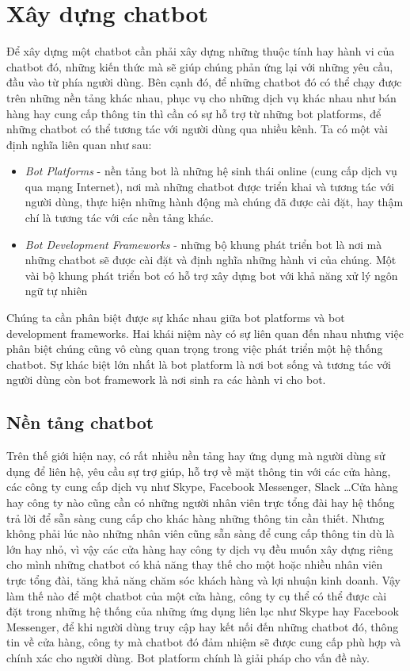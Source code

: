 \documentclass[12pt]{report}
\begin{document}
\section{Xây dựng chatbot}

Để xây dựng một chatbot cần phải xây dựng những thuộc tính hay hành vi của chatbot đó, những kiến thức mà sẽ giúp chúng phản ứng lại với những yêu cầu, đầu vào từ phía người dùng. Bên cạnh đó, để những chatbot đó có thể chạy được trên những nền tảng khác nhau, phục vụ cho những dịch vụ khác nhau như bán hàng hay cung cấp thông tin thì cần có sự hỗ trợ từ những bot platforms, để những chatbot có thể tương tác với người dùng qua nhiều kênh. Ta có một vài định nghĩa liên quan như sau:

\begin{itemize}
	\item \textit{Bot Platforms} - nền tảng bot là những hệ sinh thái online (cung cấp dịch vụ qua mạng Internet), nơi mà những chatbot được triển khai và tương tác với người dùng, thực hiện những hành động mà chúng đã được cài đặt, hay thậm chí là tương tác với các nền tảng khác.
	\item \textit{Bot Development Frameworks} - những bộ khung phát triển bot là nơi mà những chatbot sẽ được cài đặt và định nghĩa những hành vi của chúng. Một vài bộ khung phát triển bot có hỗ trợ xây dựng bot với khả năng xử lý ngôn ngữ tự nhiên
\end{itemize}

Chúng ta cần phân biệt được sự khác nhau giữa bot platforms và bot development frameworks. Hai khái niệm này có sự liên quan đến nhau nhưng việc phân biệt chúng cũng vô cùng quan trọng trong việc phát triển một hệ thống chatbot. Sự khác biệt lớn nhất là bot platform là nơi bot sống và tương tác với người dùng còn bot framework là nơi sinh ra các hành vi cho bot.

\subsection{Nền tảng chatbot}

Trên thế giới hiện nay, có rất nhiều nền tảng hay ứng dụng mà người dùng sử dụng để liên hệ, yêu cầu sự trợ giúp, hỗ trợ về mặt thông tin với các cửa hàng, các công ty cung cấp dịch vụ như Skype, Facebook Messenger, Slack \ldots Cửa hàng hay công ty nào cũng cần có những người nhân viên trực tổng đài hay hệ thống trả lời để sẵn sàng cung cấp cho khác hàng những thông tin cần thiết. Nhưng không phải lúc nào những nhân viên cũng sẵn sàng để cung cấp thông tin dù là lớn hay nhỏ, vì vậy các cửa hàng hay công ty dịch vụ đều muốn xây dựng riêng cho mình những chatbot có khả năng thay thế cho một hoặc nhiều nhân viên trực tổng đài, tăng khả năng chăm sóc khách hàng và lợi nhuận kinh doanh. Vậy làm thế nào để một chatbot của một cửa hàng, công ty cụ thể có thể được cài đặt trong những hệ thống của những ứng dụng liên lạc như Skype hay Facebook Messenger, để khi người dùng truy cập hay kết nối đến những chatbot đó, thông tin về cửa hàng, công ty mà chatbot đó đảm nhiệm sẽ được cung cấp phù hợp và chính xác cho người dùng. Bot platform chính là giải pháp cho vấn đề này.
\end{document}
